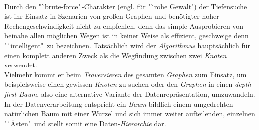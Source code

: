 \documentclass[12pt]{article}
\begin{document}
\\
Durch den "`brute-force"\,-Charakter (engl. für "`rohe Gewalt") der Tiefensuche ist ihr Einsatz in Szenarien von großen Graphen und benötigter hoher Rechengeschwindigkeit nicht zu empfehlen, denn das simple Ausprobieren von beinahe allen möglichen Wegen ist in keiner Weise als effizient, geschweige denn "`intelligent"\ zu bezeichnen. Tatsächlich wird der \textit{Algorithmus} hauptsächlich für einen komplett anderen Zweck als die Wegfindung zwischen zwei \textit{Knoten} verwendet.
\\
Vielmehr kommt er beim \textit{Traversieren} des gesamten \textit{Graphen} zum Einsatz, um beispielsweise einen gewissen \textit{Knoten} zu suchen oder den \textit{Graphen} in einen \textit{depth-first Baum}, also eine alternative Variante der Datenrepräsentation, umzuwandeln. In der Datenverarbeitung entspricht ein \textit{Baum} bildlich einem umgedrehten natürlichen Baum mit einer Wurzel und sich immer weiter aufteilenden, einzelnen "`Ästen"\, und stellt somit eine Daten-\textit{Hierarchie} dar.
\end{document}
